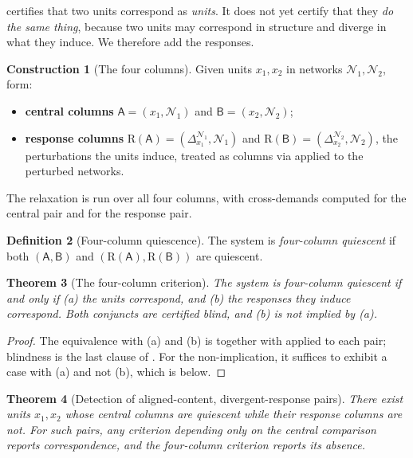 \documentclass[11pt,twocolumn,a4paper]{article}
\newtheorem{theorem}{Theorem}[section]
\theoremstyle{definition}
\newtheorem{definition}[theorem]{Definition}
\newtheorem{construction}[theorem]{Construction}
\theoremstyle{remark}
\newcommand{\colA}{\mathsf{A}}
\newcommand{\colB}{\mathsf{B}}
\newcommand{\Resp}{\mathrm{R}}
\newcommand{\netw}{\mathcal{N}}
\newcommand{\Perturb}{\Delta}
\begin{document}
 certifies that two units correspond as
\emph{units}. It does not yet certify that they \emph{do the same thing},
because two units may correspond in structure and diverge in what they
induce. We therefore add the responses.

\begin{construction}[The four columns]
\label{con:four}
Given units $x_1,x_2$ in networks $\netw_1,\netw_2$, form:
\begin{itemize}[leftmargin=1.4em,itemsep=1pt]
  \item \textbf{central columns} $\colA=(x_1,\netw_1)$ and
  $\colB=(x_2,\netw_2)$;
  \item \textbf{response columns} $\Resp(\colA)=(\Perturb^{\netw_1}_{x_1},
  \netw_1)$ and $\Resp(\colB)=(\Perturb^{\netw_2}_{x_2},\netw_2)$,
  the perturbations the units induce, treated as columns via
   applied to the perturbed networks.
\end{itemize}
The relaxation is run over all four columns, with cross-demands computed
for the central pair and for the response pair.
\end{construction}

\begin{definition}[Four-column quiescence]
\label{def:fourq}
The system is \emph{four-column quiescent} if both
$(\colA,\colB)$ and $(\Resp(\colA),\Resp(\colB))$ are quiescent.
\end{definition}

\begin{theorem}[The four-column criterion]
\label{thm:four}
The system is four-column quiescent if and only if
\textup{(a)} the units correspond, and \textup{(b)} the responses they
induce correspond. Both conjuncts are certified blind, and (b) is not
implied by (a).
\end{theorem}

\begin{proof}
The equivalence with (a) and (b) is  together with
 applied to each pair; blindness is the last clause
of . For the non-implication, it suffices to exhibit
a case with (a) and not (b), which is  below.
\end{proof}

\begin{theorem}[Detection of aligned-content, divergent-response pairs]
\label{thm:falsefriend}
There exist units $x_1,x_2$ whose central columns are quiescent while
their response columns are not. For such pairs, any criterion depending
only on the central comparison reports correspondence, and the four-column
criterion reports its absence.
\end{theorem}
\end{document}
